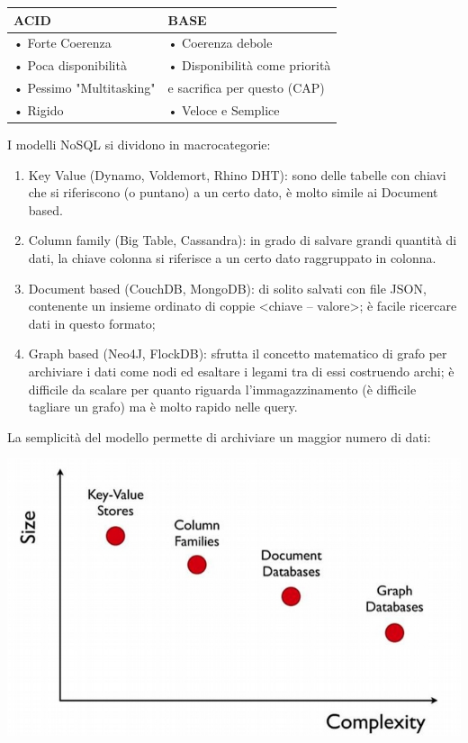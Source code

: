 \documentclass[a4page, 11pt]{article}
\begin{document}
\begin{center}
\begin{tabular}{|l|l|}
\hline
ACID & BASE \\
\hline
• Forte Coerenza & • Coerenza debole \\
• Poca disponibilità & • Disponibilità come priorità \\
• Pessimo "Multitasking" & \quad e sacrifica per questo (CAP)\\
• Rigido & • Veloce e Semplice \\
\hline
\end{tabular}
\end{center}

I modelli NoSQL si dividono in macrocategorie:
\begin{enumerate}[noitemsep]
\item Key Value (Dynamo, Voldemort, Rhino DHT): sono delle tabelle con chiavi che si riferiscono (o puntano) a un certo dato, è molto simile ai Document based.
\item Column family (Big Table, Cassandra): in grado di salvare grandi quantità di dati, la chiave colonna si riferisce a un certo dato raggruppato in colonna.
\item Document based (CouchDB, MongoDB): di solito salvati con file JSON, contenente un insieme ordinato di coppie \textless{}chiave -- valore\textgreater{}; è facile ricercare dati in questo formato;
\item Graph based (Neo4J, FlockDB): sfrutta il concetto matematico di grafo per archiviare i dati come nodi ed esaltare i legami tra di essi costruendo archi; è difficile da scalare per quanto riguarda l'immagazzinamento (è difficile tagliare un grafo) ma è molto rapido nelle query.
\end{enumerate}

La semplicità del modello permette di archiviare un maggior numero di dati:
\begin{center}
	\includegraphics[scale=0.4]{IMAGE1.jpg}
\end{center}
\end{document}
